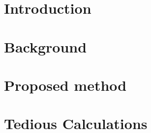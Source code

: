 \documentclass[12pt]{article}
\begin{document}
\def\by{\bm{y}} %
\def\bY{\bm{Y}} %

\def\bz{\bm{z}} %
\def\bmu{\boldsymbol{\mu}}
\def\br{\bm{r}}


\def\bphi{\boldsymbol{\varphi}}
\def\bbeta{\boldsymbol{\beta}}

\def\Ecal{\mathcal{E}}
\def\R{\mathbb{R}}
\def\N{\mathcal{N}}
\def\P{\mathbb{P}}


\section{Introduction}



\section{Background}


\section{Proposed method}


\newpage


\newpage
\appendix
\section{Tedious Calculations}

\end{document}
